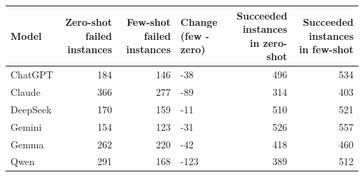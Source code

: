 \begin{tabular}{lrrlrr}
\toprule
Model & Zero-shot failed instances & Few-shot failed instances & Change (few - zero) & Succeeded instances in zero-shot & Succeeded instances in few-shot \\
\midrule
ChatGPT & 184 & 146 & -38 & 496 & 534 \\
Claude & 366 & 277 & -89 & 314 & 403 \\
DeepSeek & 170 & 159 & -11 & 510 & 521 \\
Gemini & 154 & 123 & -31 & 526 & 557 \\
Gemma & 262 & 220 & -42 & 418 & 460 \\
Qwen & 291 & 168 & -123 & 389 & 512 \\
\bottomrule
\end{tabular}
